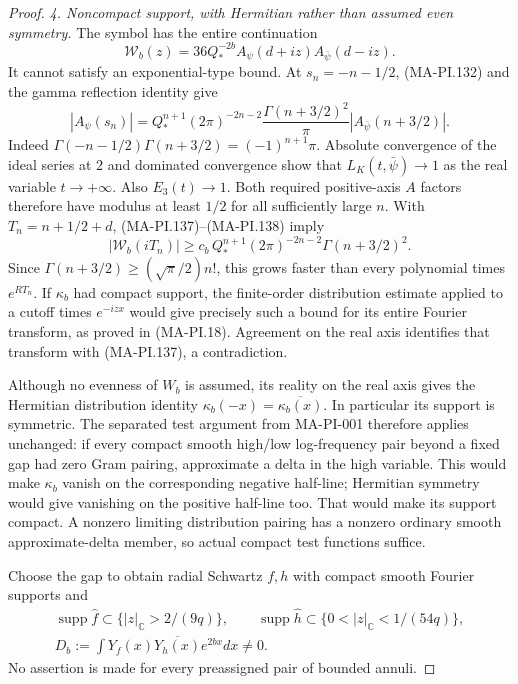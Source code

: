 \begin{proof}
\emph{4. Noncompact support, with Hermitian rather than assumed even symmetry.}
The symbol has the entire continuation
\[
       \mathscr W_b(z)
         =36Q_*^{-2b}A_\psi(d+iz)A_{\bar\psi}(d-iz).
 \tag{MA-PI.137}
\]
It cannot satisfy an exponential-type bound.  At
$s_n=-n-1/2$, (MA-PI.132) and the gamma reflection
identity give
\[
 |A_\psi(s_n)|
   =Q_*^{n+1}(2\pi)^{-2n-2}
       \frac{\Gamma(n+3/2)^2}{\pi}
                            |A_{\bar\psi}(n+3/2)|.
 \tag{MA-PI.138}
\]
Indeed
$\Gamma(-n-1/2)\Gamma(n+3/2)=(-1)^{n+1}\pi$.
Absolute convergence of the ideal series at $2$ and
dominated convergence show that $L_K(t,\bar\psi)\to1$
as the real variable $t\to+\infty$.  Also $E_3(t)\to1$.
Both required positive-axis $A$ factors therefore have
modulus at least $1/2$ for all sufficiently large $n$.
With $T_n=n+1/2+d$, (MA-PI.137)--(MA-PI.138) imply
\[
 |\mathscr W_b(iT_n)|
   \ge c_b\,Q_*^{n+1}(2\pi)^{-2n-2}\Gamma(n+3/2)^2.
 \tag{MA-PI.139}
\]
Since $\Gamma(n+3/2)\ge(\sqrt\pi/2)n!$, this grows
faster than every polynomial times $e^{R T_n}$.
If $\kappa_b$ had compact support, the finite-order
distribution estimate applied to a cutoff times
$e^{-izx}$ would give precisely such a bound for its
entire Fourier transform, as proved in (MA-PI.18).
Agreement on the real axis identifies that transform
with (MA-PI.137), a contradiction.

Although no evenness of $W_b$ is assumed, its reality
on the real axis gives the Hermitian distribution identity
$\kappa_b(-x)=\overline{\kappa_b(x)}$.
In particular its support is symmetric.  The separated
test argument from MA-PI-001 therefore applies unchanged:
if every compact smooth high/low log-frequency pair
beyond a fixed gap had zero Gram pairing, approximate
a delta in the high variable.  This would make
$\kappa_b$ vanish on the corresponding negative
half-line; Hermitian symmetry would give vanishing
on the positive half-line too.  That would make its
support compact.  A nonzero limiting distribution
pairing has a nonzero ordinary smooth approximate-delta
member, so actual compact test functions suffice.

Choose the gap to obtain radial Schwartz $f,h$ with
compact smooth Fourier supports and
\[
 \begin{gathered}
 \operatorname{supp}\widehat f
       \subset\{|z|_{\mathbb C}>2/(9q)\},\qquad
 \operatorname{supp}\widehat h
       \subset\{0<|z|_{\mathbb C}<1/(54q)\},\\
 D_b:=\int Y_f(x)\overline{Y_h(x)}e^{2bx}dx\ne0.
 \end{gathered}
 \tag{MA-PI.140}
\]
No assertion is made for every preassigned pair of
bounded annuli.


\end{proof}

